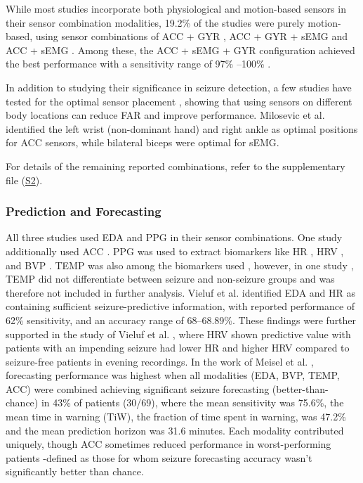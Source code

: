 While most studies incorporate both physiological and motion-based sensors in their sensor combination modalities, 19.2\% of the studies were purely motion-based, using sensor combinations of ACC + GYR \cite{Larsen2024-vn,Dong2022-oo}, ACC + GYR + sEMG \cite{Wang2025-my,Gheryani2017-yg} and ACC + sEMG \cite{Milosevic2016-ee}. Among these, the ACC + sEMG + GYR configuration achieved the best performance with a sensitivity range of 97\% \cite{Gheryani2017-yg}--100\% \cite{Wang2025-ql}.    

In addition to studying their significance in seizure detection, a few studies have tested for the optimal sensor placement \cite{Milosevic2016-ee,De_Cooman2018-pq}, showing that using sensors on different body locations can reduce FAR and improve performance. Milosevic et al. \cite{Milosevic2016-ee} identified the left wrist (non-dominant hand) and right ankle as optimal positions for ACC sensors, while bilateral biceps were optimal for sEMG.

For details of the remaining reported combinations, refer to the supplementary file (\href{https://docs.google.com/spreadsheets/d/1FjxwkHFbNDM84nuqg513gR_0vIVql-evoT1EMiqSYZU/edit?pli=1&gid=1893827577#gid=1893827577}{S2}).

\subsubsection{Prediction and Forecasting}
All three studies used EDA and PPG in their sensor combinations. One study additionally used ACC \cite{Meisel2020-ii}. PPG was used to extract biomarkers like HR \cite{Vieluf2023-ta,Vieluf2023-zv}, HRV \cite{Vieluf2023-zv}, and BVP \cite{Meisel2020-ii}. TEMP was also among the biomarkers used \cite{Vieluf2023-zv,Meisel2020-ii}, however, in one study \cite{Vieluf2023-zv}, TEMP did not differentiate between seizure and non-seizure groups and was therefore not included in further analysis. Vieluf et al. \cite{Vieluf2023-ta,Vieluf2023-zv} identified EDA and HR as containing sufficient seizure-predictive information, with reported performance of 62\% sensitivity, and an accuracy range of 68–68.89\%. These findings were further supported in the study of Vieluf et al. \cite{Vieluf2023-zv} , where HRV shown predictive value with patients with an impending seizure had lower HR and higher HRV compared to seizure-free patients in evening recordings. In the work of Meisel et al. \cite{Meisel2020-ii},  forecasting performance was highest when all modalities (EDA, BVP, TEMP, ACC) were combined achieving significant seizure forecasting (better-than-chance) in 43\% of patients (30/69), where the mean sensitivity was 75.6\%, the mean time in warning (TiW), the fraction of time spent in warning,  was 47.2\% and the mean prediction horizon was 31.6 minutes. Each modality contributed uniquely, though ACC sometimes reduced performance in worst-performing  patients -defined as those for whom seizure forecasting accuracy wasn’t significantly better than chance.
